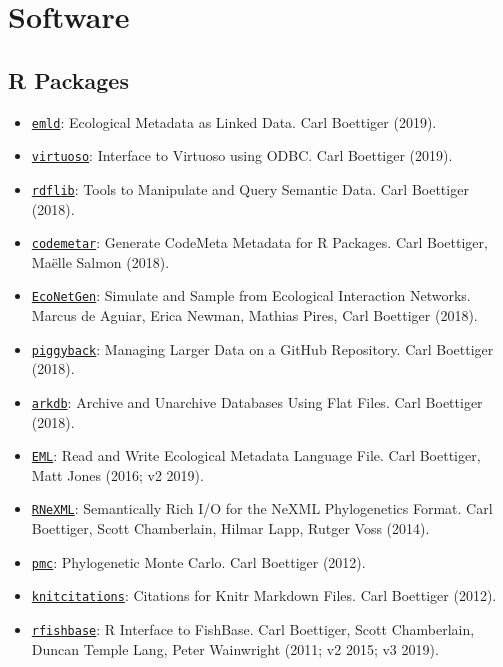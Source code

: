 \documentclass[10pt,sans]{moderncv}        %
\providecommand{\tightlist}{%
    \setlength{\itemsep}{0pt}\setlength{\parskip}{0pt}}
\begin{document}
\hypertarget{software}{%
\section{Software}\label{software}}

\hypertarget{r-packages}{%
\subsection{R Packages}\label{r-packages}}

\begin{itemize}
\tightlist
\item
  \href{https://github.com/ropensci/emld}{\texttt{emld}}: Ecological
  Metadata as Linked Data. Carl Boettiger (2019).
\item
  \href{https://github.com/ropensci/virtuoso}{\texttt{virtuoso}}:
  Interface to Virtuoso using ODBC. Carl Boettiger (2019).
\item
  \href{https://github.com/ropensci/rdflib}{\texttt{rdflib}}: Tools to
  Manipulate and Query Semantic Data. Carl Boettiger (2018).
\item
  \href{https://github.com/ropensci/codemetar}{\texttt{codemetar}}:
  Generate CodeMeta Metadata for R Packages. Carl Boettiger, Maëlle
  Salmon (2018).
\item
  \href{https://github.com/cboettig/EcoNetGen}{\texttt{EcoNetGen}}:
  Simulate and Sample from Ecological Interaction Networks. Marcus de
  Aguiar, Erica Newman, Mathias Pires, Carl Boettiger (2018).
\item
  \href{https://github.com/ropensci/piggyback/}{\texttt{piggyback}}:
  Managing Larger Data on a GitHub Repository. Carl Boettiger (2018).
\item
  \href{https://github.com/ropensci/arkdb/}{\texttt{arkdb}}: Archive and
  Unarchive Databases Using Flat Files. Carl Boettiger (2018).
\item
  \href{https://github.com/ropensci/EML}{\texttt{EML}}: Read and Write
  Ecological Metadata Language File. Carl Boettiger, Matt Jones (2016;
  v2 2019).
\item
  \href{https://github.com/ropensci/RNeXML}{\texttt{RNeXML}}:
  Semantically Rich I/O for the NeXML Phylogenetics Format. Carl
  Boettiger, Scott Chamberlain, Hilmar Lapp, Rutger Voss (2014).
\item
  \href{https://github.com/cboettig/pmc}{\texttt{pmc}}: Phylogenetic
  Monte Carlo. Carl Boettiger (2012).
\item
  \href{https://github.com/cboettig/knitcitations}{\texttt{knitcitations}}:
  Citations for Knitr Markdown Files. Carl Boettiger (2012).
\item
  \href{https://github.com/ropensci/rfishbase}{\texttt{rfishbase}}: R
  Interface to FishBase. Carl Boettiger, Scott Chamberlain, Duncan
  Temple Lang, Peter Wainwright (2011; v2 2015; v3 2019).
\end{itemize}
\end{document}
